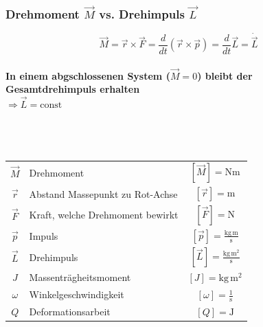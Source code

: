 	
	
	
	\subsubsection{Drehmoment $\vec{M}$ vs. Drehimpuls $\vec{L}$}
	
	$$ \boxed{ \vec{M} = \vec{r} \times \vec{F} = \frac{d}{dt} (\vec{r} \times \vec{p}) =  \frac{d}{dt} \vec{L} = \dot{\vec{L}} }$$ \\
	
	\textbf{In einem abgschlossenen System ($\vec{M} = 0$) bleibt der \\
	Gesamtdrehimpuls erhalten} \\
	$\Rightarrow \vec{L} = \text{const}$ \\
	\\
	\\
	\\
	
	
	\begin{tabular}{c l c}
	$\vec{M}$ & Drehmoment & $[\vec{M}] = \mathrm{Nm}$ \\
	$\vec{r}$ & Abstand Massepunkt zu Rot-Achse & $[\vec{r}] = \mathrm{m}$ \\
	$\vec{F}$ & Kraft, welche Drehmoment bewirkt & $[\vec{F}] = \mathrm{N}$ \\
	$\vec{p}$ & Impuls & $[\vec{p}] = \mathrm{\frac{kg \, m}{s}}$ \\
	$\vec{L}$ & Drehimpuls & $[\vec{L}] = \mathrm{\frac{kg \, m^2}{s}}$ \\
	$J$  & Massenträgheitsmoment & $[J] = \mathrm{kg \, m^2}$ \\
	$\omega$ & Winkelgeschwindigkeit & $[\omega] = \mathrm{\frac{1}{s}}$ \\
	$Q$ & Deformationsarbeit & $[Q] = \mathrm{J}$ \\
	\end{tabular}
	
